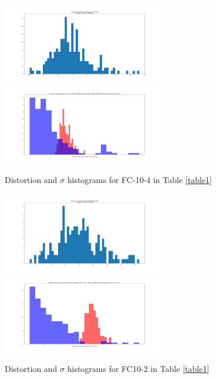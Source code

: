 \documentclass[10pt]{extarticle}
\begin{document}
\begin{figure}[H]
\includegraphics[trim=200 80 100 100, clip,width=7cm]{2019-04-10-adverse/gamma_sigma/FC10-4-distortion_hist.png}\includegraphics[trim=200 80 100 100, clip,width=7cm]{2019-04-10-adverse/gamma_sigma/FC10-4-gamma1_hist.png}
\caption{Distortion and $\sigma$ histograms for FC-10-4 in Table \ref{table1}}
\label{table1hist1}
\end{figure}
\begin{figure}[H]
\includegraphics[trim=200 80 100 100, clip,width=7cm]{2019-04-10-adverse/gamma_sigma/FC10-2-distortion_hist.png}\includegraphics[trim=200 80 100 100, clip,width=7cm]{2019-04-10-adverse/gamma_sigma/FC10-2-gamma1_hist.png}
\caption{Distortion and $\sigma$ histograms for FC10-2 in Table \ref{table1}}
\label{table1hist2}
\end{figure}
\end{document}
